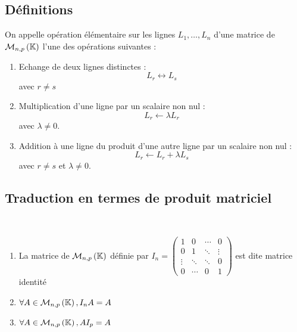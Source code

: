 \subsection{Définitions}
\begin{defi}
    On appelle opération élémentaire sur les lignes \(L_1, \dots , L_n\) d’une matrice de \(\mathcal{M}_{n,p}\left(\mathbb{K}\right)\) l’une des opérations suivantes :
    \begin{enumerate}
        \item  Echange de deux lignes distinctes :
        \[L_r \leftrightarrow L_s\]
        avec \(r \neq s\)
        \item Multiplication d’une ligne par un scalaire non nul :    
        \[L_r \leftarrow \lambda L_r\]
        avec \(\lambda \neq 0 \).       
        \item Addition à une ligne du produit d’une autre ligne par un scalaire non nul :     
        \[L_r \leftarrow L_r + \lambda L_s\] 
        avec \(r\neq s\) et \( \lambda \neq 0\).
    \end{enumerate}
\end{defi}

\subsection{Traduction en termes de produit matriciel}
\begin{defprop}
    ~\\
    \begin{enumerate}
        \item La matrice de \(\mathcal{M}_{n,p}\left(\mathbb{K}\right)\) définie par \(I_n = \begin{pmatrix}
1 & 0 & \cdots & 0 \\
0 & 1 & \ddots & \vdots \\
\vdots & \ddots & \ddots & 0 \\
0 & \cdots & 0 & 1
\end{pmatrix} \) est dite matrice identité
        \item \(\forall A \in \mathcal{M}_{n,p}\left(\mathbb{K}\right), I_nA = A\)
        \item \(\forall A \in \mathcal{M}_{n,p}\left(\mathbb{K}\right), A I_p = A\)
    \end{enumerate}
\end{defprop}

